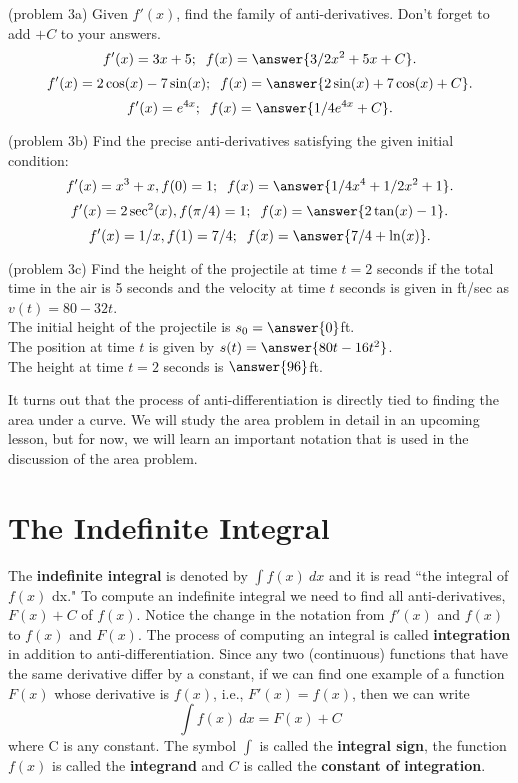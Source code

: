 \documentclass[handout]{ximera}
\begin{document}
\begin{problem}(problem 3a)
Given $f'(x)$, find the family of anti-derivatives. Don't forget to add $+C$ to your answers.
\[
f'(x) = 3x + 5; \;\; f(x) = \answer{3/2x^2 + 5x +C}.
\]
\[
f'(x) = 2\cos(x) - 7\sin(x); \;\; f(x) = \answer{2\sin(x) + 7\cos(x) +C}.
\]
\[
f'(x) = e^{4x}; \;\; f(x) = \answer{1/4e^{4x} +C}.
\]

\end{problem}



\begin{problem}(problem 3b)
Find the precise anti-derivatives satisfying the given initial condition:
\[
f'(x) = x^3 + x, f(0) = 1;\;\; f(x) = \answer{1/4x^4 + 1/2x^2 + 1}.
\]
\[
f'(x) = 2\sec^2(x), f(\pi/4) = 1; \;\; f(x) = \answer{2\tan(x) - 1}.
\]
\[
f'(x) = 1/x, f(1) = 7/4; \;\; f(x) = \answer{7/4 + \ln(x)}.
\]

\end{problem}



\begin{problem}(problem 3c)
Find the height of the projectile at time $t = 2$ seconds if the total time in the air is 5 seconds 
and the velocity at time $t$ seconds is given in ft/sec as $v(t) = 80-32t$.\\
The initial height of the projectile is $s_0 = \answer{0}$ft.\\
The position at time $t$ is given by $s(t) = \answer{80t - 16t^2}$.\\
The height at time $t = 2$ seconds is $\answer{96}$ft.\\
\end{problem}



It turns out that the process of anti-differentiation is directly tied to finding the area under a curve.
We will study the area problem in detail in an upcoming lesson, but for now, we will learn an important notation that
is used in the discussion of the area problem.



\section{The Indefinite Integral}

The \textbf{indefinite integral} is denoted by $\int f(x) \ dx$ and it is read ``the integral of $f(x)$ dx." To compute an indefinite integral we need to 
find all anti-derivatives, $F(x) + C$ of $f(x)$. Notice the change in the notation from $f'(x)$ and $f(x)$
to $f(x)$ and $F(x)$. The process of computing an integral is called \textbf{integration} in addition to anti-differentiation.  
Since any two (continuous) functions that have the same derivative differ by a constant, 
if we can find one example of a function $F(x)$ whose derivative is $f(x)$, i.e., $F'(x) = f(x)$, then we can write
\[\int f(x) \ dx = F(x) + C\]
where C is any constant.  The symbol $\int$ is called the \textbf{integral sign}, 
the function $f(x)$ is called the \textbf{integrand} and $C$ is called the \textbf{constant of integration}.  
\end{document}
